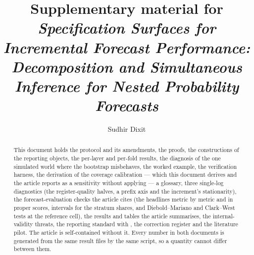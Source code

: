 \documentclass[preprint,12pt,authoryear]{elsarticle}
\theoremstyle{definition}
\newif\ifblind
\begin{document}
\begin{frontmatter}

\title{Supplementary material for\\
\emph{Specification Surfaces for Incremental Forecast Performance:
Decomposition and Simultaneous Inference for Nested Probability Forecasts}}

\ifblind\else
\author[ind]{Sudhir Dixit}
\address[ind]{Independent Researcher, \affiliationStreet, \affiliationCity, \affiliationRegion, \affiliationCountry}
\fi

\begin{abstract}
This document holds the protocol and its amendments, the proofs, the
constructions of the reporting objects, the per-layer and per-fold results,
the diagnosis of the one simulated world where the bootstrap misbehaves, the
worked example, the verification harness, the derivation of the coverage
calibration --- which this document derives and the article reports as a
sensitivity without applying --- a glossary, three single-log diagnostics
(the register-quality halves, a prefix axis and the increment's
stationarity), the forecast-evaluation checks the article cites (the
headlines metric by metric and in proper scores, intervals for the stratum
shares, and Diebold--Mariano and Clark--West tests at the reference cell),
the results and tables the article summarises, the internal-validity threats,
the reporting standard with \pkgname, the correction register and the
literature pilot. The article is self-contained without it. Every number in both documents is
generated from the same result files by the same script, so a quantity cannot
differ between them.
\end{abstract}

\end{frontmatter}

\tableofcontents
\clearpage
\end{document}

